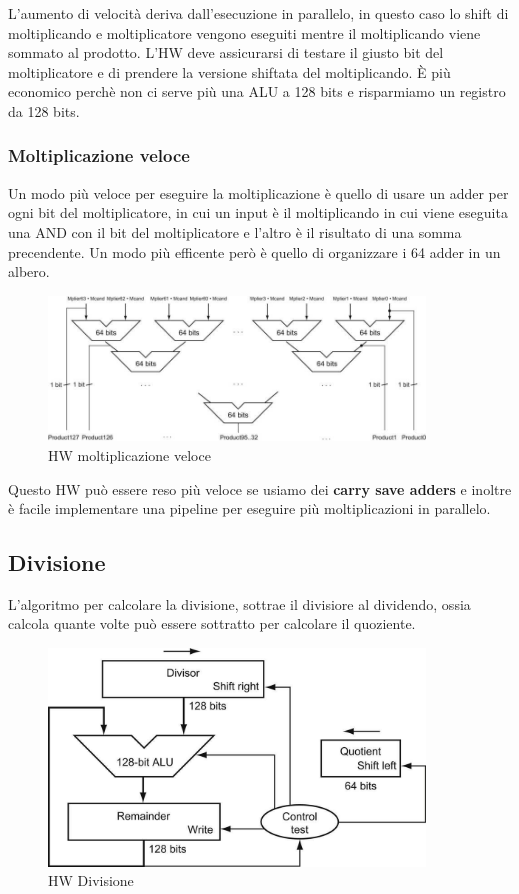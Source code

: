 L'aumento di velocità deriva dall'esecuzione in parallelo, in questo caso lo shift di moltiplicando e moltiplicatore vengono eseguiti 
mentre il moltiplicando viene sommato al prodotto. L'HW deve assicurarsi di testare il giusto bit del moltiplicatore e di 
prendere la versione shiftata del moltiplicando. È più economico perchè non ci serve più una ALU a 128 bits e risparmiamo un 
registro da 128 bits. 

\subsubsection{Moltiplicazione veloce}

Un modo più veloce per eseguire la moltiplicazione è quello di usare un adder per ogni bit del moltiplicatore, in cui
un input è il moltiplicando in cui viene eseguita una AND con il bit del moltiplicatore e l'altro è il risultato di una 
somma precendente. Un modo più efficente però è quello di organizzare i 64 adder in un albero.

\begin{figure}[H]
    \centering
    \includegraphics[width=100mm,scale=1.5]{pictures/schema-moltiplicazione-veloce.png}
    \caption{HW moltiplicazione veloce}
    \label{fig:hw-multiplication-fast}
\end{figure}

Questo HW può essere reso più veloce se usiamo dei \textbf{carry save adders} e inoltre è facile implementare una pipeline
per eseguire più moltiplicazioni in parallelo.

\subsection{Divisione}
L'algoritmo per calcolare la divisione, sottrae il divisiore al dividendo, ossia calcola quante volte può essere sottratto 
per calcolare il quoziente.

\begin{figure}[H]
    \centering
    \includegraphics[width=100mm,scale=1.5]{pictures/schema-divisione.png}
    \caption{HW Divisione}
    \label{fig:hw-division}
\end{figure}

